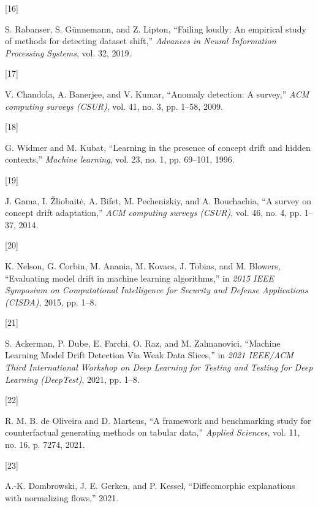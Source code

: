 \documentclass[conference,final,]{IEEEtran}
\newlength{\cslhangindent}
\newlength{\csllabelwidth}
\newlength{\cslentryspacingunit} %
\newenvironment{CSLReferences}[2] %
 {%
  \setlength{\parindent}{0pt}
  \ifodd #1
  \let\oldpar\par
  \def\par{\hangindent=\cslhangindent\oldpar}
  \fi
  \setlength{\parskip}{#2\cslentryspacingunit}
 }%
 {}
\newcommand{\CSLLeftMargin}[1]{\parbox[t]{\csllabelwidth}{#1}}
\newcommand{\CSLRightInline}[1]{\parbox[t]{\linewidth - \csllabelwidth}{#1}\break}
\theoremstyle{definition}
\theoremstyle{definition}
\theoremstyle{definition}
\theoremstyle{definition}
\theoremstyle{remark}
\begin{document}
\begin{CSLReferences}{0}{0}
\leavevmode{}%
\CSLLeftMargin{{[}16{]} }%
\CSLRightInline{S. Rabanser, S. Günnemann, and Z. Lipton, {``Failing loudly: {An} empirical study of methods for detecting dataset shift,''} \emph{Advances in Neural Information Processing Systems}, vol. 32, 2019.}

\leavevmode{}%
\CSLLeftMargin{{[}17{]} }%
\CSLRightInline{V. Chandola, A. Banerjee, and V. Kumar, {``Anomaly detection: {A} survey,''} \emph{ACM computing surveys (CSUR)}, vol. 41, no. 3, pp. 1--58, 2009.}

\leavevmode{}%
\CSLLeftMargin{{[}18{]} }%
\CSLRightInline{G. Widmer and M. Kubat, {``Learning in the presence of concept drift and hidden contexts,''} \emph{Machine learning}, vol. 23, no. 1, pp. 69--101, 1996.}

\leavevmode{}%
\CSLLeftMargin{{[}19{]} }%
\CSLRightInline{J. Gama, I. Žliobaitė, A. Bifet, M. Pechenizkiy, and A. Bouchachia, {``A survey on concept drift adaptation,''} \emph{ACM computing surveys (CSUR)}, vol. 46, no. 4, pp. 1--37, 2014.}

\leavevmode{}%
\CSLLeftMargin{{[}20{]} }%
\CSLRightInline{K. Nelson, G. Corbin, M. Anania, M. Kovacs, J. Tobias, and M. Blowers, {``Evaluating model drift in machine learning algorithms,''} in \emph{2015 {IEEE Symposium} on {Computational Intelligence} for {Security} and {Defense Applications} ({CISDA})}, 2015, pp. 1--8.}

\leavevmode{}%
\CSLLeftMargin{{[}21{]} }%
\CSLRightInline{S. Ackerman, P. Dube, E. Farchi, O. Raz, and M. Zalmanovici, {``Machine {Learning Model Drift Detection Via Weak Data Slices},''} in \emph{2021 {IEEE}/{ACM Third International Workshop} on {Deep Learning} for {Testing} and {Testing} for {Deep Learning} ({DeepTest})}, 2021, pp. 1--8.}

\leavevmode{}%
\CSLLeftMargin{{[}22{]} }%
\CSLRightInline{R. M. B. de Oliveira and D. Martens, {``A framework and benchmarking study for counterfactual generating methods on tabular data,''} \emph{Applied Sciences}, vol. 11, no. 16, p. 7274, 2021.}

\leavevmode{}%
\CSLLeftMargin{{[}23{]} }%
\CSLRightInline{A.-K. Dombrowski, J. E. Gerken, and P. Kessel, {``Diffeomorphic explanations with normalizing flows,''} 2021.}


\end{CSLReferences}
\end{document}
